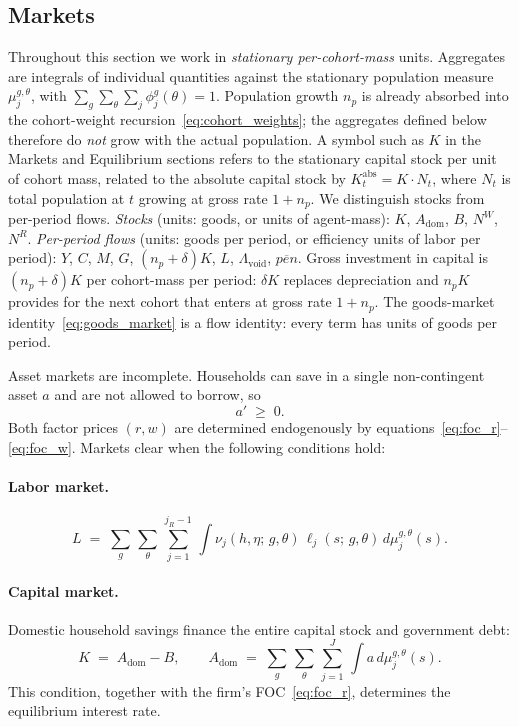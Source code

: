 \documentclass[12pt,a4paper]{article}
\begin{document}
\subsection{Markets}
\label{subsec:markets}
\par Throughout this section we work in \emph{stationary per-cohort-mass} units. Aggregates are integrals of individual quantities against the stationary population measure $\mu_j^{g,\theta}$, with $\sum_g \sum_\theta \sum_j \phi_j^{g}(\theta) = 1$. Population growth $n_p$ is already absorbed into the cohort-weight recursion~\eqref{eq:cohort_weights}; the aggregates defined below therefore do \emph{not} grow with the actual population. A symbol such as $K$ in the Markets and Equilibrium sections refers to the stationary capital stock per unit of cohort mass, related to the absolute capital stock by $K^{\mathrm{abs}}_t = K \cdot N_t$, where $N_t$ is total population at $t$ growing at gross rate $1+n_p$. We distinguish stocks from per-period flows. \emph{Stocks} (units: goods, or units of agent-mass): $K$, $A_{\mathrm{dom}}$, $B$, $N^W$, $N^R$. \emph{Per-period flows} (units: goods per period, or efficiency units of labor per period): $Y$, $C$, $M$, $G$, $(n_p+\delta) K$, $L$, $\Lambda_{\mathrm{void}}$, $\overline{pen}$. Gross investment in capital is $(n_p+\delta) K$ per cohort-mass per period: $\delta K$ replaces depreciation and $n_p K$ provides for the next cohort that enters at gross rate $1+n_p$. The goods-market identity~\eqref{eq:goods_market} is a flow identity: every term has units of goods per period.

\par Asset markets are incomplete. Households can save in a single non-contingent asset $a$ and are not allowed to borrow, so
\begin{equation}
\label{eq:borrowing_constraint}
a' \;\geq\; 0.
\end{equation}
Both factor prices $(r, w)$ are determined endogenously by equations~\eqref{eq:foc_r}--\eqref{eq:foc_w}. Markets clear when the following conditions hold:

\paragraph{Labor market.}
\begin{equation}
\label{eq:labor_market}
L \;=\; \sum_g\, \sum_\theta\, \sum_{j=1}^{j_R - 1}\, \int \nu_j(h, \eta;\, g, \theta)\, \ell_j(s;\, g, \theta)\, d\mu_{j}^{g,\theta}(s).
\end{equation}
\paragraph{Capital market.}
Domestic household savings finance the entire capital stock and government debt:
\begin{equation}
\label{eq:capital_market}
K \;=\; A_{\mathrm{dom}} - B,
\qquad
A_{\mathrm{dom}} \;=\; \sum_g\,\sum_\theta\, \sum_{j=1}^{J}\, \int a\, d\mu_j^{g,\theta}(s).
\end{equation}
This condition, together with the firm's FOC~\eqref{eq:foc_r}, determines the equilibrium interest rate.
\end{document}
